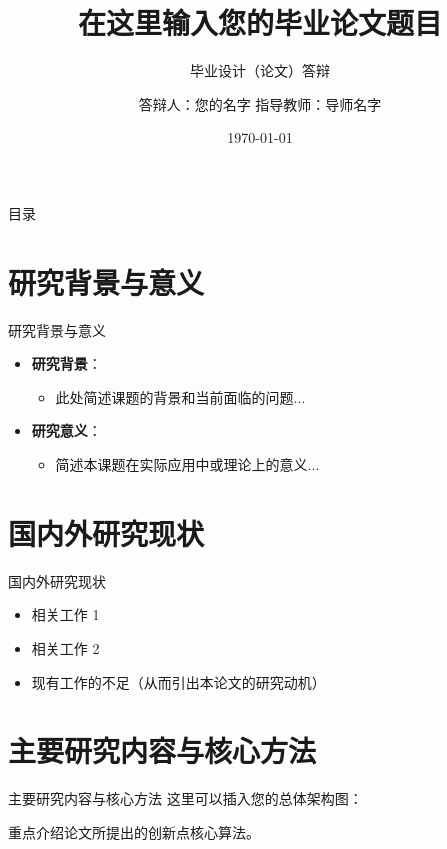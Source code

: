 \documentclass[UTF8]{ctexbeamer}
\title{在这里输入您的毕业论文题目}
\subtitle{毕业设计（论文）答辩}
\author{答辩人：您的名字 \quad 指导教师：导师名字}
\institute{您的学院名称 / 大学名称}
\date{\today}
\begin{document}
\begin{frame}
    \titlepage
\end{frame}

\begin{frame}{目录}
    \tableofcontents
\end{frame}

\section{研究背景与意义}
\begin{frame}{研究背景与意义}
    \begin{itemize}
        \item \textbf{研究背景}：
        \begin{itemize}
            \item 此处简述课题的背景和当前面临的问题...
        \end{itemize}
        \vspace{0.5cm}
        \item \textbf{研究意义}：
        \begin{itemize}
            \item 简述本课题在实际应用中或理论上的意义...
        \end{itemize}
    \end{itemize}
\end{frame}

\section{国内外研究现状}
\begin{frame}{国内外研究现状}
    \begin{itemize}
        \item 相关工作 1
        \vspace{0.3cm}
        \item 相关工作 2
        \vspace{0.3cm}
        \item 现有工作的不足（从而引出本论文的研究动机）
    \end{itemize}
\end{frame}

\section{主要研究内容与核心方法}
\begin{frame}{主要研究内容与核心方法}
    这里可以插入您的总体架构图：
    
    
    重点介绍论文所提出的创新点核心算法。
\end{frame}
\end{document}
